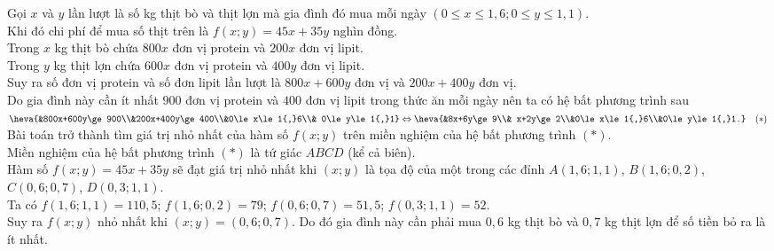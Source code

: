 \begin{bt}
{\begin{center}
		\end{center}
		Gọi $ x $ và $ y $ lần lượt là số kg thịt bò và thịt lợn mà gia đình đó mua mỗi ngày $ (0\le x\le 1{,}6; 0\le y\le 1{,}1) .$\\
		Khi đó chi phí để mua số thịt trên là $ f(x;y)=45x+35y $ nghìn đồng.\\
		Trong $ x $ kg thịt bò chứa $ 800x $ đơn vị protein và $ 200x $ đơn vị lipit.\\
		Trong $ y $ kg thịt lợn chứa $ 600x $ đơn vị protein và $ 400y $ đơn vị lipit.\\
		Suy ra số đơn vị protein và số đơn lipit lần lượt là $ 800x+600y $ đơn vị và $ 200x+400y $ đơn vị.\\
		Do gia đình này cần ít nhất $ 900 $ đơn vị protein và $ 400 $ đơn vị lipit trong thức ăn mỗi ngày nên ta có hệ bất phương trình sau $ \heva{&800x+600y\ge 900\\&200x+400y\ge 400\\&0\le x\le 1{,}6\\& 0\le y\le 1{,}1} \Leftrightarrow\heva{&8x+6y\ge 9\\& x+2y\ge 2\\&0\le x\le 1{,}6\\&0\le y\le 1{,}1.} \quad (*)$\\
		Bài toán trở thành tìm giá trị nhỏ nhất của hàm số $ f(x ; y) $ trên miền nghiệm của hệ bất phương trình $ (*) $.\\
		Miền nghiệm của hệ bất phương trình $ (*) $ là tứ giác $ ABCD $ (kể cả biên).\\
		Hàm số $ f(x;y)=45x+35y $ sẽ đạt giá trị nhỏ nhất khi $ (x ; y) $ là tọa độ của một trong các đỉnh $ A(1{,}6 ; 1{,}1) $, $ B(1{,}6 ; 0{,}2) $, $ C(0{,}6 ; 0{,}7) $, $ D(0{,}3 ; 1{,}1)$.\\
		Ta có $ f(1{,}6 ; 1{,}1)=110{,}5$; $ f(1{,}6 ; 0{,}2)=79$; $ f(0{,}6 ; 0{,}7)=51{,}5 $; $ f(0{,}3 ; 1{,}1) =52$.\\
		Suy ra $ f(x;y) $ nhỏ nhất khi $ (x;y)=(0{,}6;0{,}7) $. Do đó gia đình này cần phải mua $ 0{,}6 $ kg thịt bò và
		$ 0{,}7 $ kg thịt lợn để số tiền bỏ ra là ít nhất. 
	}
\end{bt}

